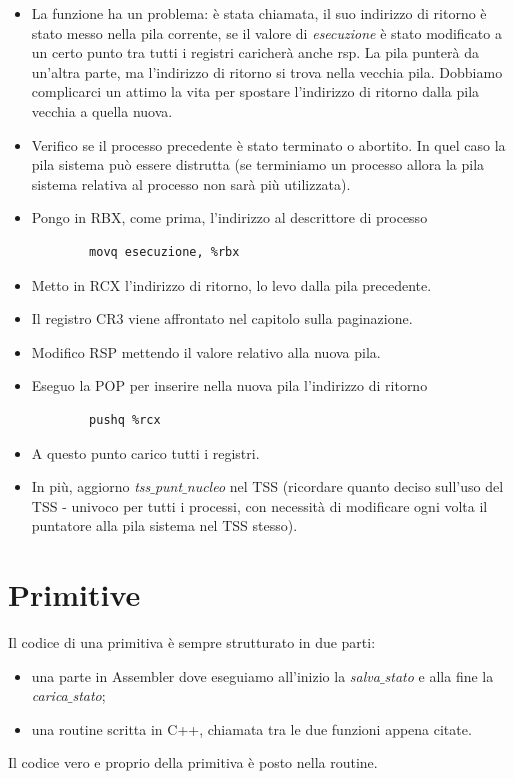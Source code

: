\begin{itemize}
	\item La funzione ha un problema: è stata chiamata, il suo indirizzo di ritorno è stato messo nella pila corrente, se il valore di \emph{esecuzione} è stato modificato a un certo punto tra tutti i registri caricherà anche rsp. La pila punterà da un'altra parte, ma l'indirizzo di ritorno si trova nella vecchia pila. Dobbiamo complicarci un attimo la vita per spostare l'indirizzo di ritorno dalla pila vecchia a quella nuova.
	\item Verifico se il processo precedente è stato terminato o abortito. In quel caso la pila sistema può essere distrutta (se terminiamo un processo allora la pila sistema relativa al processo non sarà più utilizzata).
	\item Pongo in RBX, come prima, l'indirizzo al descrittore di processo
	\begin{verbatim}
		movq esecuzione, %rbx
	\end{verbatim}
	\item Metto in RCX l'indirizzo di ritorno, lo levo dalla pila precedente.
	\item Il registro CR3 viene affrontato nel capitolo sulla paginazione.
	\item Modifico RSP mettendo il valore relativo alla nuova pila.
	\item Eseguo la POP per inserire nella nuova pila l'indirizzo di ritorno
	\begin{verbatim}
		pushq %rcx
	\end{verbatim}
	\item A questo punto carico tutti i registri. 
	\item In più, aggiorno \emph{tss$\_$punt$\_$nucleo}  nel TSS (ricordare quanto deciso sull'uso del TSS - univoco per tutti i processi, con necessità di modificare ogni volta il puntatore alla pila sistema nel TSS stesso).
\end{itemize}




\section{Primitive}
Il codice di una primitiva è sempre strutturato in due parti:
\begin{itemize}
	\item una parte in Assembler dove eseguiamo all'inizio la \emph{salva$\_$stato} e alla fine la \emph{carica$\_$stato};
	\item una routine scritta in C++, chiamata tra le due funzioni appena citate.
\end{itemize}
Il codice vero e proprio della primitiva è posto nella routine.

